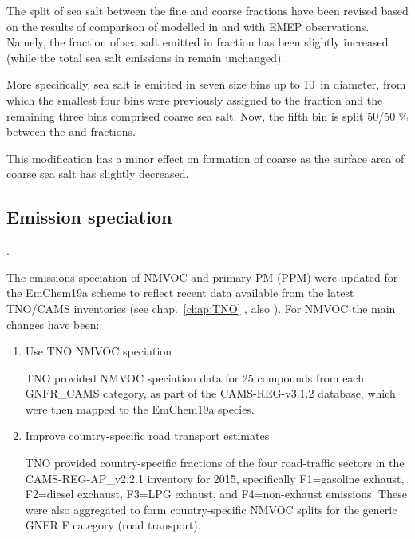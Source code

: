 The split of sea salt between the fine and coarse fractions have been revised based on the results of comparison of modelled  in \PM[2.5] and \PM[10] with EMEP observations. Namely, the fraction of sea salt emitted in \PM[2.5] fraction has been slightly increased (while the total sea salt emissions in \PM[10] remain unchanged). 

More specifically, sea salt is emitted in seven size bins up to 10~\um in diameter, from which the smallest four bins were previously assigned to the \PM[2.5] fraction and the remaining three bins comprised coarse sea salt. Now, the fifth bin is split 50/50 \% between the \PM[2.5] and \PM[2.5-10] fractions.  


This modification has a minor effect on formation of coarse \noiii as the surface area of coarse sea salt has slightly decreased.



\subsection{Emission speciation}
\label{ssec:emissplits}.


The emissions speciation of NMVOC and primary PM (PPM) were updated
for the EmChem19a scheme to reflect recent data available from
the latest TNO/CAMS inventories (see chap.~\ref{chap:TNO} 
, also
\citealt{CAMSemis2019}).  For NMVOC the main changes have been:

\begin{enumerate}
  \item Use TNO NMVOC speciation

    TNO provided NMVOC speciation data for 25 compounds from each
    GNFR\_CAMS category, as part of the CAMS-REG-v3.1.2 database,
    which were then mapped to the EmChem19a species.

  \item Improve country-specific road transport estimates

    TNO provided country-specific fractions of the four road-traffic
    sectors in the CAMS-REG-AP\_v2.2.1 inventory for 2015, specifically
    F1=gasoline exhaust, F2=diesel exchaust, F3=LPG exhaust, and
    F4=non-exhaust emissions. These were also aggregated to form
    country-specific NMVOC splits for the generic GNFR F category
    (road transport).

\end{enumerate}

